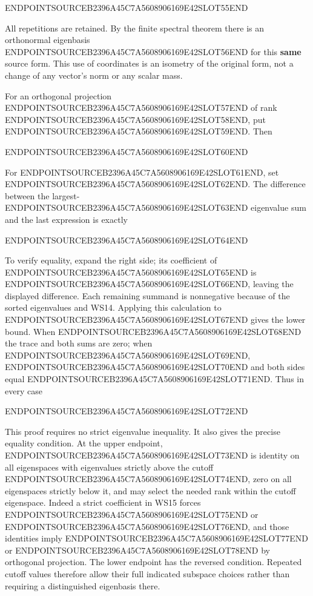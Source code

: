 ENDPOINTSOURCEB2396A45C7A5608906169E42SLOT55END

All repetitions are retained. By the finite spectral theorem there is an orthonormal eigenbasis ENDPOINTSOURCEB2396A45C7A5608906169E42SLOT56END for this \textbf{same} source form. This use of coordinates is an isometry of the original form, not a change of any vector's norm or any scalar mass.

For an orthogonal projection ENDPOINTSOURCEB2396A45C7A5608906169E42SLOT57END of rank ENDPOINTSOURCEB2396A45C7A5608906169E42SLOT58END, put ENDPOINTSOURCEB2396A45C7A5608906169E42SLOT59END. Then

ENDPOINTSOURCEB2396A45C7A5608906169E42SLOT60END

For ENDPOINTSOURCEB2396A45C7A5608906169E42SLOT61END, set ENDPOINTSOURCEB2396A45C7A5608906169E42SLOT62END. The difference between the largest-ENDPOINTSOURCEB2396A45C7A5608906169E42SLOT63END eigenvalue sum and the last expression is exactly

ENDPOINTSOURCEB2396A45C7A5608906169E42SLOT64END

To verify equality, expand the right side; its coefficient of ENDPOINTSOURCEB2396A45C7A5608906169E42SLOT65END is ENDPOINTSOURCEB2396A45C7A5608906169E42SLOT66END, leaving the displayed difference. Each remaining summand is nonnegative because of the sorted eigenvalues and WS14. Applying this calculation to ENDPOINTSOURCEB2396A45C7A5608906169E42SLOT67END gives the lower bound. When ENDPOINTSOURCEB2396A45C7A5608906169E42SLOT68END the trace and both sums are zero; when ENDPOINTSOURCEB2396A45C7A5608906169E42SLOT69END, ENDPOINTSOURCEB2396A45C7A5608906169E42SLOT70END and both sides equal ENDPOINTSOURCEB2396A45C7A5608906169E42SLOT71END. Thus in every case

ENDPOINTSOURCEB2396A45C7A5608906169E42SLOT72END

This proof requires no strict eigenvalue inequality. It also gives the precise equality condition. At the upper endpoint, ENDPOINTSOURCEB2396A45C7A5608906169E42SLOT73END is identity on all eigenspaces with eigenvalues strictly above the cutoff ENDPOINTSOURCEB2396A45C7A5608906169E42SLOT74END, zero on all eigenspaces strictly below it, and may select the needed rank within the cutoff eigenspace. Indeed a strict coefficient in WS15 forces ENDPOINTSOURCEB2396A45C7A5608906169E42SLOT75END or ENDPOINTSOURCEB2396A45C7A5608906169E42SLOT76END, and those identities imply ENDPOINTSOURCEB2396A45C7A5608906169E42SLOT77END or ENDPOINTSOURCEB2396A45C7A5608906169E42SLOT78END by orthogonal projection. The lower endpoint has the reversed condition. Repeated cutoff values therefore allow their full indicated subspace choices rather than requiring a distinguished eigenbasis there.

